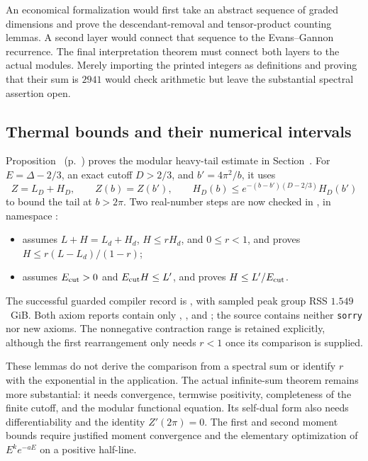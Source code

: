 An economical formalization would first take an abstract sequence of
graded dimensions and prove the descendant-removal and tensor-product
counting lemmas. A second layer would connect that sequence to the
Evans--Gannon recurrence. The final interpretation theorem must connect
both layers to the actual modules. Merely importing the printed
integers as definitions and proving that their sum is $2941$ would
check arithmetic but leave the substantial spectral assertion open.

\subsection{Thermal bounds and their numerical intervals}

Proposition~
(p.~) proves the modular heavy-tail
estimate in Section~. For
$E=\Delta-2/3$, an exact cutoff $D>2/3$, and $b'=4\pi^2/b$, it uses
\[
 Z=L_D+H_D,\qquad Z(b)=Z(b'),\qquad
 H_D(b)\leq e^{-(b-b')(D-2/3)}H_D(b')
\]
to bound the tail at $b>2\pi$. Two real-number steps are now checked in
, in namespace
:
\begin{itemize}
\item {} assumes
$L+H=L_d+H_d$, $H\leq rH_d$, and $0\leq r<1$, and proves
$H\leq r(L-L_d)/(1-r)$;
\item {} assumes
$E_{\rm cut}>0$ and $E_{\rm cut}H\leq L'$, and proves
$H\leq L'/E_{\rm cut}$.
\end{itemize}
The successful guarded compiler record is
, with sampled peak
group RSS $1.549$~GiB. Both axiom reports contain only
, , and ;
the source contains neither \texttt{sorry} nor new axioms. The
nonnegative contraction range is retained explicitly, although the
first rearrangement only needs $r<1$ once its comparison is supplied.

These lemmas do not derive the comparison from a spectral sum or
identify $r$ with the exponential in the application. The actual
infinite-sum theorem remains more substantial: it needs convergence,
termwise positivity, completeness of the finite cutoff, and the
modular functional equation. Its self-dual form also needs
differentiability and the identity $Z'(2\pi)=0$. The first and second
moment bounds require justified moment convergence and the elementary
optimization of $E^ke^{-aE}$ on a positive half-line.

